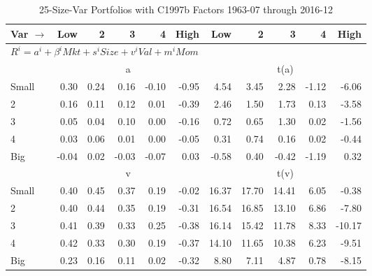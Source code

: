 
\begin{table}[!ht]
\footnotesize
\centering
\caption{25-Size-Var Portfolios with C1997b Factors 1963-07 through 2016-12}
\begin{tabular}{lrrrrrrrrrr}
  \toprule
    Var $\rightarrow$ & Low & 2 & 3 & 4 & High & Low & 2 & 3 & 4 & High \\ 
  \midrule
  \multicolumn{11}{l}{$R^i=a^i+\beta^iMkt+s^iSize+v^iVal+m^iMom$} \\

  
    
      & \multicolumn{5}{c}{a} & \multicolumn{5}{c}{t(a)}
    
    \\
      \cmidrule(r){2-6} \cmidrule(r){7-11}

    Small   & 0.30  & 0.24  & 0.16  & -0.10  & -0.95  & 4.54  & 3.45  & 2.28  & -1.12  & -6.06  \\
         2  & 0.16  & 0.11  & 0.12  & 0.01  & -0.39  & 2.46  & 1.50  & 1.73  & 0.13  & -3.58  \\
         3  & 0.05  & 0.04  & 0.10  & 0.00  & -0.16  & 0.72  & 0.65  & 1.30  & 0.02  & -1.56  \\
         4  & 0.03  & 0.06  & 0.01  & 0.00  & -0.05  & 0.31  & 0.74  & 0.16  & 0.02  & -0.44  \\
    Big     & -0.04  & 0.02  & -0.03  & -0.07  & 0.03  & -0.58  & 0.40  & -0.42  & -1.19  & 0.32  \\

  
    
      & \multicolumn{5}{c}{v} & \multicolumn{5}{c}{t(v)}
    
    \\
      \cmidrule(r){2-6} \cmidrule(r){7-11}

    Small   & 0.40  & 0.45  & 0.37  & 0.19  & -0.02  & 16.37  & 17.70  & 14.41  & 6.05  & -0.38  \\
         2  & 0.40  & 0.44  & 0.35  & 0.19  & -0.31  & 16.54  & 16.85  & 13.10  & 6.86  & -7.80  \\
         3  & 0.41  & 0.39  & 0.33  & 0.25  & -0.38  & 16.14  & 15.42  & 11.78  & 8.33  & -10.17  \\
         4  & 0.42  & 0.33  & 0.30  & 0.19  & -0.37  & 14.10  & 11.65  & 10.38  & 6.23  & -9.51  \\
    Big     & 0.23  & 0.16  & 0.11  & 0.02  & -0.32  & 8.80  & 7.11  & 4.87  & 0.78  & -8.15  \\

  
    

\end{tabular}
\end{table}
